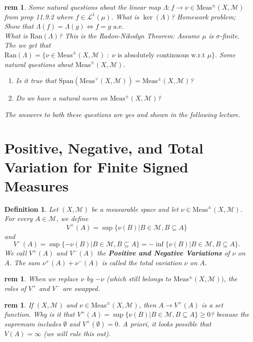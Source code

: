 \documentclass[letterpaper, 12pt]{article}
\newcommand{\st}{\; : \; }
\newcommand{\fin}{\qquad \quad \hfill \framebox[1.75mm][l]{\,}}
\newcommand{\cL}{\mathcal{L}}
\newcommand{\cM}{\mathcal{M}}
\newcommand{\Meas}{\mathrm{Meas}}
\theoremstyle{stdthm}
\theoremstyle{stddef}
\newtheorem{defn}[thm]{Definition}
\newtheorem{rem}[thm]{rem} %
\theoremstyle{stdnonum}
\theoremstyle{stdqands}
\theoremstyle{stdbold}
\begin{document}
\begin{rem}
Some natural questions about the linear map $\Lambda: f \rightarrow \nu \in \Meas^{\pm}(X,\cM)$ from prop 11.9.2 where $f \in \cL^1(\mu)$. What is $\ker(\Lambda)$? Homework problem; Show that $\Lambda(f) = \Lambda(g) \Longleftrightarrow f = g \mbox{ a.e.}$ \\

\noindent What is $\mathrm{Ran}(\Lambda)$? This is the Radon-Nikodyn Theorem: Assume $\mu$ is $\sigma$-finite. The we get that $\mathrm{Ran}(\Lambda) = \{\nu\in\Meas^{\pm}(X,\cM)\st \nu \mbox{ is absolutely continuous w.r.t } \mu \}$. Some natural questions about $\Meas^{\pm}(X,\cM)$.
\begin{enumerate}
\item Is it true that $\mathrm{Span}(\Meas^+(X,\cM)) = \Meas^{\pm}(X,\cM)$?
\item Do we have a natural norm on $\Meas^{\pm}(X, \cM)$? 
\end{enumerate}
The answers to both these questions are yes and shown in the following lecture. 
\end{rem}


\newpage


\section{Positive, Negative, and Total Variation for Finite Signed Measures}

\begin{defn}
Let $(X,\cM)$ be a measurable space and let $\nu \in \Meas^{\pm}(X,\cM)$. For every $A \in \cM$, we define
\[ V^+(A) = \sup \{ \nu(B)|B  \in \cM, B \subseteq A\} \] 
and
\[ V^{-}(A) = \sup\{ -\nu(B)| B \in \cM, B\subseteq A\} = -\inf\{\nu(B)| B \in \cM, B \subseteq A\}.\]
We call $V^+(A)$ and $V^-(A)$ the {\bf Positive and Negative Variations} of $\nu$ on $A$. The sum $\nu^+(A) + \nu^-(A)$ is called the total variation $\nu$ on $A$. 
\end{defn}

\begin{rem}
When we replace $\nu$ by $-\nu$ (which still belongs to $\Meas^\pm (X,\cM))$, the roles of $V^+$ and $V^-$ are swapped.
\end{rem}

\begin{rem}
If $(X,\cM)$ and  $\nu \in \Meas^\pm(X,\cM)$, then $A \rightarrow V^+(A) $ is a set function. Why is it that $V^+(A) = \sup \{ \nu(B)| B \in \cM, B \subseteq A\} \geq 0$? because the supremum includes $\emptyset$ and $V^+(\emptyset) = 0$. A priori, it looks possible that $V(A) = \infty$ (we will rule this out). 
\end{rem}
\end{document}
